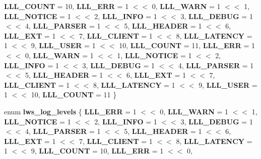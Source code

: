 \begin{DoxyCompactItemize}
{\bfseries L\+L\+L\+\_\+\+C\+O\+U\+NT} = 10, 
{\bfseries L\+L\+L\+\_\+\+E\+RR} = 1 $<$$<$ 0, 
{\bfseries L\+L\+L\+\_\+\+W\+A\+RN} = 1 $<$$<$ 1, 
{\bfseries L\+L\+L\+\_\+\+N\+O\+T\+I\+CE} = 1 $<$$<$ 2, 
\newline
{\bfseries L\+L\+L\+\_\+\+I\+N\+FO} = 1 $<$$<$ 3, 
{\bfseries L\+L\+L\+\_\+\+D\+E\+B\+UG} = 1 $<$$<$ 4, 
{\bfseries L\+L\+L\+\_\+\+P\+A\+R\+S\+ER} = 1 $<$$<$ 5, 
{\bfseries L\+L\+L\+\_\+\+H\+E\+A\+D\+ER} = 1 $<$$<$ 6, 
\newline
{\bfseries L\+L\+L\+\_\+\+E\+XT} = 1 $<$$<$ 7, 
{\bfseries L\+L\+L\+\_\+\+C\+L\+I\+E\+NT} = 1 $<$$<$ 8, 
{\bfseries L\+L\+L\+\_\+\+L\+A\+T\+E\+N\+CY} = 1 $<$$<$ 9, 
{\bfseries L\+L\+L\+\_\+\+U\+S\+ER} = 1 $<$$<$ 10, 
\newline
{\bfseries L\+L\+L\+\_\+\+C\+O\+U\+NT} = 11, 
{\bfseries L\+L\+L\+\_\+\+E\+RR} = 1 $<$$<$ 0, 
{\bfseries L\+L\+L\+\_\+\+W\+A\+RN} = 1 $<$$<$ 1, 
{\bfseries L\+L\+L\+\_\+\+N\+O\+T\+I\+CE} = 1 $<$$<$ 2, 
\newline
{\bfseries L\+L\+L\+\_\+\+I\+N\+FO} = 1 $<$$<$ 3, 
{\bfseries L\+L\+L\+\_\+\+D\+E\+B\+UG} = 1 $<$$<$ 4, 
{\bfseries L\+L\+L\+\_\+\+P\+A\+R\+S\+ER} = 1 $<$$<$ 5, 
{\bfseries L\+L\+L\+\_\+\+H\+E\+A\+D\+ER} = 1 $<$$<$ 6, 
\newline
{\bfseries L\+L\+L\+\_\+\+E\+XT} = 1 $<$$<$ 7, 
{\bfseries L\+L\+L\+\_\+\+C\+L\+I\+E\+NT} = 1 $<$$<$ 8, 
{\bfseries L\+L\+L\+\_\+\+L\+A\+T\+E\+N\+CY} = 1 $<$$<$ 9, 
{\bfseries L\+L\+L\+\_\+\+U\+S\+ER} = 1 $<$$<$ 10, 
\newline
{\bfseries L\+L\+L\+\_\+\+C\+O\+U\+NT} = 11
 \}
\item 
\mbox{\label{group__log_ga14542b84d2c76efa7814124bb10f9c5f}} 
enum {\bfseries lws\+\_\+log\+\_\+levels} \{ \newline
{\bfseries L\+L\+L\+\_\+\+E\+RR} = 1 $<$$<$ 0, 
{\bfseries L\+L\+L\+\_\+\+W\+A\+RN} = 1 $<$$<$ 1, 
{\bfseries L\+L\+L\+\_\+\+N\+O\+T\+I\+CE} = 1 $<$$<$ 2, 
{\bfseries L\+L\+L\+\_\+\+I\+N\+FO} = 1 $<$$<$ 3, 
\newline
{\bfseries L\+L\+L\+\_\+\+D\+E\+B\+UG} = 1 $<$$<$ 4, 
{\bfseries L\+L\+L\+\_\+\+P\+A\+R\+S\+ER} = 1 $<$$<$ 5, 
{\bfseries L\+L\+L\+\_\+\+H\+E\+A\+D\+ER} = 1 $<$$<$ 6, 
{\bfseries L\+L\+L\+\_\+\+E\+XT} = 1 $<$$<$ 7, 
\newline
{\bfseries L\+L\+L\+\_\+\+C\+L\+I\+E\+NT} = 1 $<$$<$ 8, 
{\bfseries L\+L\+L\+\_\+\+L\+A\+T\+E\+N\+CY} = 1 $<$$<$ 9, 
{\bfseries L\+L\+L\+\_\+\+C\+O\+U\+NT} = 10, 
{\bfseries L\+L\+L\+\_\+\+E\+RR} = 1 $<$$<$ 0, 
$$
\end{DoxyCompactItemize}
